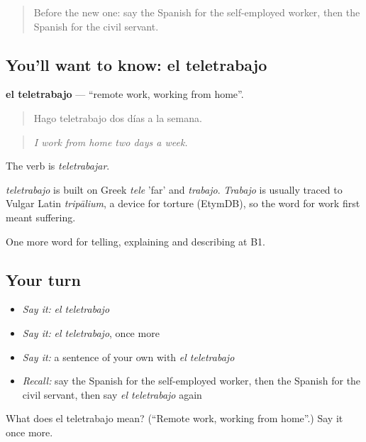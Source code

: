 \begin{quote}
Before the new one: say the Spanish for the self-employed worker, then the Spanish for the civil servant.
\end{quote}

\subsection*{You'll want to know: el teletrabajo}
\textbf{el teletrabajo} — \textquotedblleft{}remote work, working from home\textquotedblright{}.

\begin{quote}
Hago teletrabajo dos días a la semana.
\end{quote}

\begin{quote}
\emph{I work from home two days a week.}
\end{quote}

The verb is \emph{teletrabajar}.

\begin{cousinweb}
\emph{teletrabajo} is built on Greek \emph{tele} 'far' and \emph{trabajo}. \emph{Trabajo} is usually traced to Vulgar Latin \emph{tripālium}, a device for torture (EtymDB), so the word for work first meant suffering.
\end{cousinweb}

\begin{grammarlens}[title={What you've built}]
One more word for telling, explaining and describing at B1.
\end{grammarlens}

\subsection*{Your turn}
\begin{itemize}
\raggedright
  \item \emph{Say it:} \emph{el teletrabajo}
  \item \emph{Say it:} \emph{el teletrabajo}, once more
  \item \emph{Say it:} a sentence of your own with \emph{el teletrabajo}
  \item \emph{Recall:} say the Spanish for the self-employed worker, then the Spanish for the civil servant, then say \emph{el teletrabajo} again
\end{itemize}

\begin{tcolorbox}[breakable,colback=teal!4,colframe=teal!35!black,title={Before you move on}]
What does el teletrabajo mean? (\textquotedblleft{}Remote work, working from home\textquotedblright{}.) Say it once more.
\end{tcolorbox}
